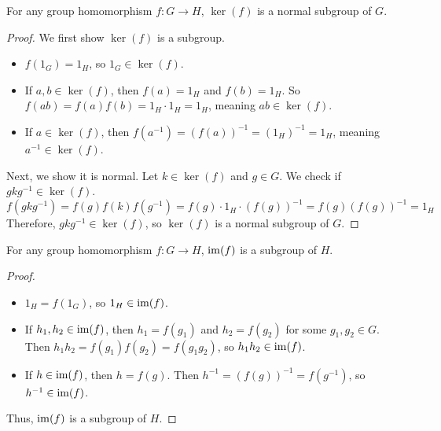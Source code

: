 \begin{lemma}
For any group homomorphism $f: G \to H$, $\ker(f)$ is a normal subgroup of $G$.
\end{lemma}
\begin{proof}
We first show $\ker(f)$ is a subgroup.
\begin{itemize}
    \item $f(1_G) = 1_H$, so $1_G \in \ker(f)$.
    \item If $a, b \in \ker(f)$, then $f(a)=1_H$ and $f(b)=1_H$. So $f(ab) = f(a)f(b) = 1_H \cdot 1_H = 1_H$, meaning $ab \in \ker(f)$.
    \item If $a \in \ker(f)$, then $f(a^{-1}) = (f(a))^{-1} = (1_H)^{-1} = 1_H$, meaning $a^{-1} \in \ker(f)$.
\end{itemize}
Next, we show it is normal. Let $k \in \ker(f)$ and $g \in G$. We check if $gkg^{-1} \in \ker(f)$.
\[
f(gkg^{-1}) = f(g)f(k)f(g^{-1}) = f(g) \cdot 1_H \cdot (f(g))^{-1} = f(g)(f(g))^{-1} = 1_H
\]
Therefore, $gkg^{-1} \in \ker(f)$, so $\ker(f)$ is a normal subgroup of $G$.
\end{proof}

\begin{lemma}
For any group homomorphism $f: G \to H$, $\operatorname{im}(f)$ is a subgroup of $H$.
\end{lemma}
\begin{proof}
\begin{itemize}
    \item $1_H = f(1_G)$, so $1_H \in \operatorname{im}(f)$.
    \item If $h_1, h_2 \in \operatorname{im}(f)$, then $h_1 = f(g_1)$ and $h_2 = f(g_2)$ for some $g_1, g_2 \in G$. Then $h_1h_2 = f(g_1)f(g_2) = f(g_1g_2)$, so $h_1h_2 \in \operatorname{im}(f)$.
    \item If $h \in \operatorname{im}(f)$, then $h=f(g)$. Then $h^{-1} = (f(g))^{-1} = f(g^{-1})$, so $h^{-1} \in \operatorname{im}(f)$.
\end{itemize}
Thus, $\operatorname{im}(f)$ is a subgroup of $H$.
\end{proof}

